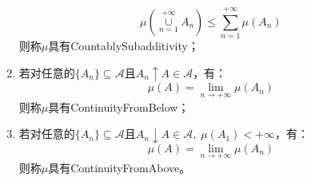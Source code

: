 \begin{definition}
\begin{enumerate}
		\begin{equation*}
			\mu\left(\underset{n=1}{\overset{+\infty}{\cup}}A_n\right)\leqslant\sum_{n=1}^{+\infty}\mu(A_n)
		\end{equation*}
		则称$\mu$具有\gls{CountablySubadditivity}；
		\item 若对任意的$\{A_n\}\subseteq\mathscr{A}$且$A_n\uparrow A\in\mathscr{A}$，有：
		\begin{equation*}
			\mu\left(A\right)=\lim_{n\to+\infty}\mu(A_n)
		\end{equation*}
		则称$\mu$具有\gls{ContinuityFromBelow}；
		\item 若对任意的$\{A_n\}\subseteq\mathscr{A}$且$A_n\downarrow A\in\mathscr{A},\;\mu(A_1)<+\infty$，有：
		\begin{equation*}
			\mu\left(A\right)=\lim_{n\to+\infty}\mu(A_n)
		\end{equation*}
		则称$\mu$具有\gls{ContinuityFromAbove}。
	\end{enumerate}
\end{definition}
